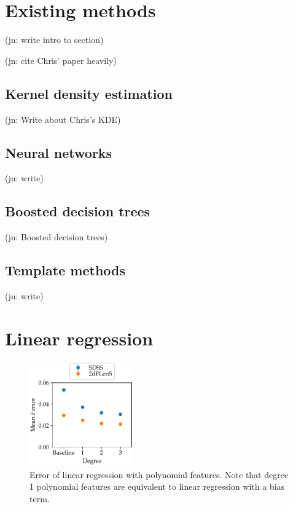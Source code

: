 \documentclass[11pt,twoside,openright]{report}
\newcommand\jn[1]{{\color{red}(jn: #1)}}
\begin{document}
\section{Existing methods}

\jn{write intro to section}

\jn{cite Chris' paper heavily}

\subsection{Kernel density estimation}

\jn{Write about Chris's KDE}

\subsection{Neural networks}

\jn{write}

\subsection{Boosted decision trees}

\jn{Boosted decision trees}

\subsection{Template methods}

\jn{write}

\section{Linear regression}
  \begin{figure}
    \centering
    \includegraphics[width=0.4\textwidth]{linreg_polynomial.pdf}
    \caption{Error of linear regression with polynomial features. Note that degree 1 polynomial features are equivalent to linear regression with a bias term.}
    \label{fig:linreg_polynomial}
  \end{figure}
\end{document}
